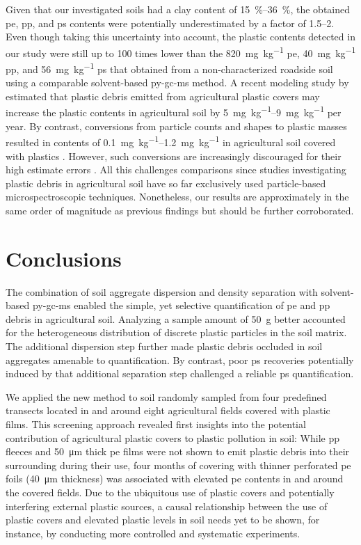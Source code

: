 Given that our investigated soils had a clay content of \SIrange{15}{36}{\percent}, the obtained \ac{pe}, \ac{pp}, and \ac{ps} contents were potentially
underestimated by a factor of \numrange{1.5}{2}. Even though taking this uncertainty into account, the plastic contents detected in our study were still up to \num{100} times lower than the \SI{820}{\milli\gram\per\kilo\gram} \ac{pe}, \SI{40}{\milli\gram\per\kilo\gram} \ac{pp}, and \SI{56}{\milli\gram\per\kilo\gram} \ac{ps} that \citet{DierkesQuantification2019} obtained from a non-characterized roadside soil using a comparable solvent-based \ac{py-gc-ms} method. A recent modeling study by \citet{BrandesIdentifying2021} estimated that plastic debris emitted from agricultural plastic covers may increase the plastic contents in agricultural soil by \SIrange{5}{9}{\milli\gram\per\kilo\gram} per year. By contrast, conversions from particle counts and shapes to plastic masses resulted in  contents of \SIrange{0.1}{1.2}{\milli\gram\per\kilo\gram} in agricultural soil covered with plastics \citep{BuksGlobal2020}. However, such conversions are increasingly discouraged for their high estimate errors \citep[Chapter~\ref{ch:analytical-techniques};][]{PrimpkeComparison2020}.
All this challenges comparisons since studies investigating plastic debris in agricultural soil have so far exclusively used particle-based microspectroscopic techniques. Nonetheless, our results are approximately in the same order of magnitude as previous findings but should be further corroborated.

\section{Conclusions}

The combination of soil aggregate dispersion and density separation with solvent-based \ac{py-gc-ms} enabled the simple, yet selective quantification of \ac{pe} and \ac{pp} debris in agricultural soil. Analyzing a sample amount of \SI{50}{\gram} better accounted for the heterogeneous distribution of discrete plastic particles in the soil matrix. The additional dispersion step further made plastic debris occluded in soil aggregates amenable to quantification. By contrast, poor \ac{ps} recoveries potentially induced by that additional separation step challenged a reliable \ac{ps} quantification.

We applied the new method to soil randomly sampled from four predefined transects located in and around eight agricultural fields covered with plastic films. This screening approach revealed first insights into the potential contribution of agricultural plastic covers to plastic pollution in soil: While \ac{pp} fleeces and \SI{50}{\micro\meter} thick \ac{pe} films were not shown to emit plastic debris into their surrounding during their use, four months of covering with thinner perforated \ac{pe} foils (\SI{40}{\micro\meter} thickness) was associated with elevated \ac{pe} contents in and around the covered fields. Due to the ubiquitous use of plastic covers and potentially interfering external plastic sources, a causal relationship between the use of plastic covers and elevated plastic levels in soil needs yet to be shown, for instance, by conducting more controlled and systematic experiments.

